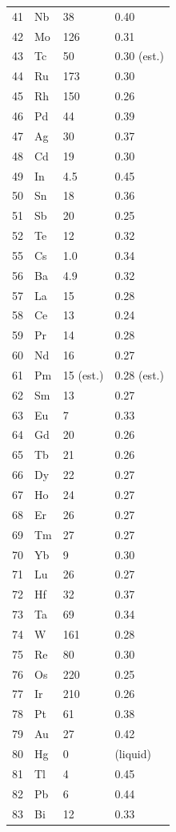 \documentclass[12pt,a4paper]{article}
\begin{document}
\begin{longtable}{p{0.6cm}p{1.2cm}p{1.5cm}p{1.5cm}}
		41 & Nb & 38 & 0.40 \\
		42 & Mo & 126 & 0.31 \\
		43 & Tc & 50 & 0.30 (est.) \\
		44 & Ru & 173 & 0.30 \\
		45 & Rh & 150 & 0.26 \\
		46 & Pd & 44 & 0.39 \\
		47 & Ag & 30 & 0.37 \\
		48 & Cd & 19 & 0.30 \\
		49 & In & 4.5 & 0.45 \\
		50 & Sn & 18 & 0.36 \\
		51 & Sb & 20 & 0.25 \\
		52 & Te & 12 & 0.32 \\
		55 & Cs & 1.0 & 0.34 \\
		56 & Ba & 4.9 & 0.32 \\
		57 & La & 15 & 0.28 \\
		58 & Ce & 13 & 0.24 \\
		59 & Pr & 14 & 0.28 \\
		60 & Nd & 16 & 0.27 \\
		61 & Pm & 15 (est.) & 0.28 (est.) \\
		62 & Sm & 13 & 0.27 \\
		63 & Eu & 7 & 0.33 \\
		64 & Gd & 20 & 0.26 \\
		65 & Tb & 21 & 0.26 \\
		66 & Dy & 22 & 0.27 \\
		67 & Ho & 24 & 0.27 \\
		68 & Er & 26 & 0.27 \\
		69 & Tm & 27 & 0.27 \\
		70 & Yb & 9 & 0.30 \\
		71 & Lu & 26 & 0.27 \\
		72 & Hf & 32 & 0.37 \\
		73 & Ta & 69 & 0.34 \\
		74 & W  & 161 & 0.28 \\
		75 & Re & 80 & 0.30 \\
		76 & Os & 220 & 0.25 \\
		77 & Ir & 210 & 0.26 \\
		78 & Pt & 61 & 0.38 \\
		79 & Au & 27 & 0.42 \\
		80 & Hg & 0 & (liquid) \\
		81 & Tl & 4 & 0.45 \\
		82 & Pb & 6 & 0.44 \\
		83 & Bi & 12 & 0.33 \\
		\bottomrule
	\end{longtable}
	
\end{document}
